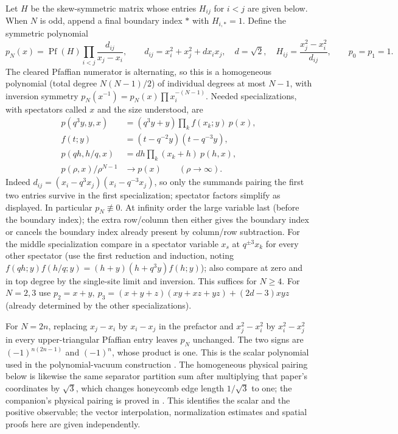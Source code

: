 Let \(H\) be the skew-symmetric matrix whose entries \(H_{ij}\) for \(i<j\) are given below. When \(N\) is odd, append a final boundary index \(*\) with \(H_{i,*}=1\). Define the symmetric polynomial
\[
 p_N(x)=\operatorname{Pf}(H)\prod_{i<j}\frac{d_{ij}}{x_j-x_i},\qquad
 d_{ij}=x_i^2+x_j^2+d x_i x_j,\quad d=\sqrt2,\quad
 H_{ij}=\frac{x_j^2-x_i^2}{d_{ij}},\qquad p_0=p_1=1 .
\]
The cleared Pfaffian numerator is alternating, so this is a homogeneous polynomial (total degree \(N(N-1)/2\)) of individual degrees at most \(N-1\), with inversion symmetry \(p_N(x^{-1})=p_N(x)\prod x_i^{-(N-1)}\). Needed specializations, with spectators called \(x\) and the size understood, are
\begin{equation}
\begin{aligned}
 p(q^3 y,y,x)&=(q^3 y+y)\prod_k f(x_k;y)\ p(x),\\
 f(t;y)&=(t-q^{-2}y)(t-q^{-3}y),\\
 p(qh,h/q,x)&=d h\prod_k(x_k+h)\ p(h,x),\\
 p(\rho,x)/\rho^{N-1}&\longrightarrow p(x)\qquad(\rho\to\infty).
\end{aligned}                                                             \label{c2:eq-22}
\end{equation}
Indeed \(d_{ij}=(x_i-q^3x_j)(x_i-q^{-3}x_j)\), so only the summands pairing the first two entries survive in the first specialization; spectator factors simplify as displayed. In particular \(p_N\not\equiv0\). At infinity order the large variable last (before the boundary index); the extra row/column then either gives the boundary index or cancels the boundary index already present by column/row subtraction. For the middle specialization compare in a spectator variable \(x_s\) at \(q^{\pm3}x_k\) for every other spectator (use the first reduction and induction, noting \(f(qh;y)f(h/q;y)=(h+y)(h+q^3y)f(h;y)\)); also compare at zero and in top degree by the single-site limit and inversion. This suffices for \(N\ge4\). For \(N=2,3\) use \(p_2=x+y,\ p_3=(x+y+z)(xy+xz+yz)+(2d-3)xyz\) (already determined by the other specializations).

\begin{remark}
\label{rem:pd:scalar-comparison}
For $N=2n$, replacing $x_j-x_i$ by $x_i-x_j$ in the prefactor and
$x_j^2-x_i^2$ by $x_i^2-x_j^2$ in every upper-triangular Pfaffian entry
leaves $p_N$ unchanged.  The two signs are
$(-1)^{n(2n-1)}$ and $(-1)^n$, whose product is one.
This is the scalar polynomial used in the polynomial-vacuum construction
\cite[Section~3.1]{PolynomialVacuumCompanion}.
The homogeneous physical pairing below is likewise the same separator
partition sum after multiplying that paper's coordinates by $\sqrt3$,
which changes honeycomb edge length $1/\sqrt3$ to one; the companion's
physical pairing is proved in \cite[Proposition~4.1]{PolynomialVacuumCompanion}.
This identifies
the scalar and the positive observable; the vector interpolation,
normalization estimates and spatial proofs here are given independently.
\end{remark}

